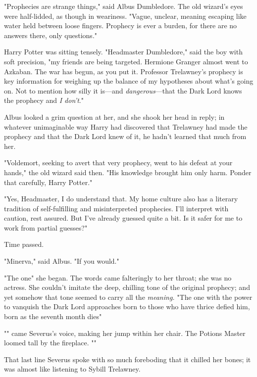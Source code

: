 "Prophecies are strange things," said Albus Dumbledore. The old wizard's eyes
were half-lidded, as though in weariness. "Vague, unclear, meaning escaping
like water held between loose fingers. Prophecy is ever a burden, for there are
no answers there, only questions."

Harry Potter was sitting tensely. "Headmaster Dumbledore," said the boy with
soft precision, "my friends are being targeted. Hermione Granger almost went to
Azkaban. The war has begun, as you put it. Professor Trelawney's prophecy is
key information for weighing up the balance of my hypotheses about what's going
on. Not to mention how silly it is—and \emph{dangerous}—that the Dark Lord
knows the prophecy and \emph{I don't}."

Albus looked a grim question at her, and she shook her head in reply; in
whatever unimaginable way Harry had discovered that Trelawney had made the
prophecy and that the Dark Lord knew of it, he hadn't learned that much from
her.

"Voldemort, seeking to avert that very prophecy, went to his defeat at your
hands," the old wizard said then. "His knowledge brought him only harm. Ponder
that carefully, Harry Potter."

"Yes, Headmaster, I do understand that. My home culture also has a literary
tradition of self-fulfilling and misinterpreted prophecies. I'll interpret with
caution, rest assured. But I've already guessed quite a bit. Is it safer for me
to work from partial guesses?"

Time passed.

"Minerva," said Albus. "If you would."

"The one{\el}" she began. The words came falteringly to her throat; she was
no actress. She couldn't imitate the deep, chilling tone of the original
prophecy; and yet somehow that tone seemed to carry all the \emph{meaning.}
"The one with the power to vanquish the Dark Lord approaches{\el} born to
those who have thrice defied him, born as the seventh month dies{\el}"

"" came Severus's voice,
making her jump within her chair. The Potions Master loomed tall by the
fireplace. ""

That last line Severus spoke with so much foreboding that it chilled her bones;
it was almost like listening to Sybill Trelawney.

